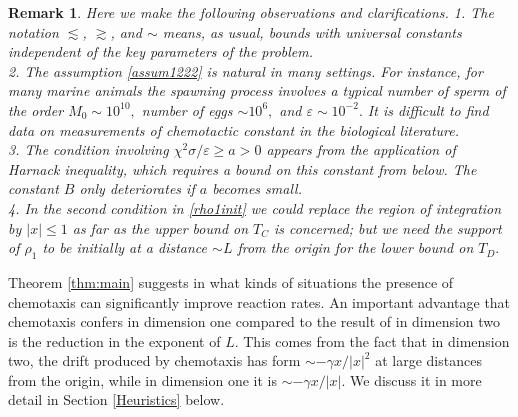 \documentclass[12pt,reqno]{amsart}
\newtheorem{remark}[theorem]{Remark}
\begin{document}
\begin{remark} Here we make the following observations and clarifications. \newline
1. The notation $\lesssim$, $\gtrsim$, and $\sim$ means, as usual, bounds with universal constants independent of the key parameters of the problem. \\
2. The assumption \eqref{assum1222} is natural in many settings. For instance, for many marine animals the spawning process involves a
typical number of sperm of the order $M_0 \sim 10^{10},$ number of eggs $\sim 10^6,$ and $\varepsilon \sim 10^{-2}.$ It is difficult to find data on measurements of chemotactic constant in the biological literature. \\
3. The condition involving $\chi^2 \sigma /\varepsilon \geq a >0$ appears from the application of Harnack inequality, which requires a bound on this constant from below. The constant $B$ only deteriorates if $a$ becomes small. \\
4. In the second condition in \eqref{rho1init} we could replace the region of integration by $|x| \leq 1$ as far as the upper bound on $T_C$ is concerned; but we need the support of $\rho_1$ to be initially at a distance $\sim L$
from the origin for the lower bound on $T_D.$
\end{remark}
Theorem \ref{thm:main} suggests in what kinds of situations the presence of chemotaxis can significantly improve reaction rates.
An important advantage that chemotaxis confers in dimension one compared to the result of \cite{KNRY} in dimension two is the reduction in the exponent of $L.$
This comes from the fact that in dimension two, the drift produced by chemotaxis has form $\sim -\gamma x/|x|^2$ at large distances from the origin, while in dimension one it is $\sim -\gamma x/|x|.$
We discuss it in more detail in Section \ref{Heuristics} below.

\end{document}
